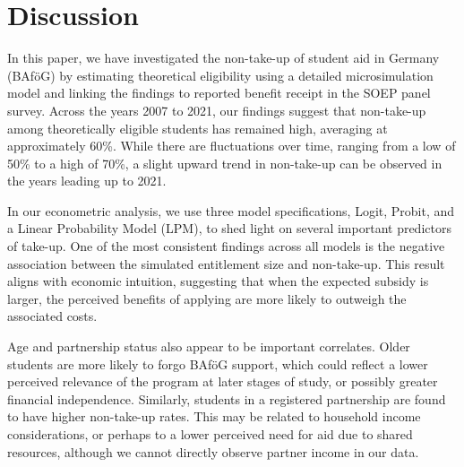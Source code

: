 \section{Discussion}

In this paper, we have investigated the non-take-up of student aid in Germany (BAföG) by estimating theoretical eligibility using a detailed microsimulation model and linking the findings to reported benefit receipt in the SOEP panel survey. Across the years 2007 to 2021, our findings suggest that non-take-up among theoretically eligible students has remained high, averaging at approximately 60\%. While there are fluctuations over time, ranging from a low of 50\% to a high of 70\%, a slight upward trend in non-take-up can be observed in the years leading up to 2021.


In our econometric analysis, we use three model specifications, Logit, Probit, and a Linear Probability Model (LPM), to shed light on several important predictors of take-up. One of the most consistent findings across all models is the negative association between the simulated entitlement size and non-take-up. This result aligns with economic intuition, suggesting that when the expected subsidy is larger, the perceived benefits of applying are more likely to outweigh the associated costs.

Age and partnership status also appear to be important correlates. Older students are more likely to forgo BAföG support, which could reflect a lower perceived relevance of the program at later stages of study, or possibly greater financial independence. Similarly, students in a registered partnership are found to have higher non-take-up rates. This may be related to household income considerations, or perhaps to a lower perceived need for aid due to shared resources, although we cannot directly observe partner income in our data.


